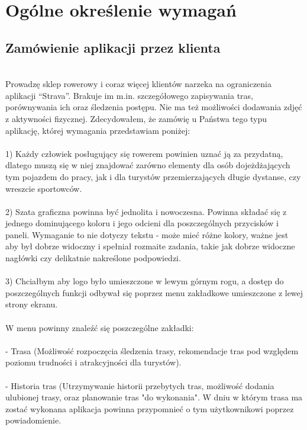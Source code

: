 	\newpage
\section{Ogólne określenie wymagań}		%

\subsection{Zamówienie aplikacji przez klienta}  %

\hspace{1cm}\\
Prowadzę sklep rowerowy i coraz więcej klientów narzeka na ograniczenia aplikacji ``Strava''. Brakuje im m.in. szczegółowego zapisywania tras, porównywania ich oraz śledzenia postępu. Nie ma też możliwości dodawania zdjęć z aktywności fizycznej. Zdecydowałem, że zamówię u Państwa tego typu aplikację, której wymagania przedstawiam poniżej: \\\\
1) Każdy człowiek posługujący się rowerem powinien uznać ją za przydatną, dlatego muszą się w niej znajdować zarówno elementy dla osób dojeżdżających tym pojazdem do pracy, jak i dla turystów przemierzających długie dystanse, czy wreszcie sportowców. \\\\
2) Szata graficzna powinna być jednolita i nowoczesna. Powinna składać się z jednego dominującego koloru i jego odcieni dla poszczególnych przycisków i paneli. Wymaganie to nie dotyczy tekstu - może mieć różne kolory, ważne jest aby był dobrze widoczny i spełniał rozmaite zadania, takie jak dobrze widoczne nagłówki czy delikatnie nakreślone podpowiedzi. \\\\
3) Chciałbym aby logo było umieszczone w lewym górnym rogu, a dostęp do poszczególnych funkcji odbywał się poprzez menu zakładkowe umieszczone z lewej strony ekranu. \\\\
W menu powinny znaleźć się poszczególne zakładki: \\\\
- Trasa (Możliwość rozpoczęcia śledzenia trasy, rekomendacje tras pod względem poziomu trudności i atrakcyjności dla turystów). \\\\
- Historia tras (Utrzymywanie historii przebytych tras, możliwość dodania ulubionej trasy, oraz planowanie tras "do wykonania". W dniu w którym trasa ma zostać wykonana aplikacja powinna przypomnieć o tym użytkownikowi poprzez powiadomienie. \\\\\\\\
